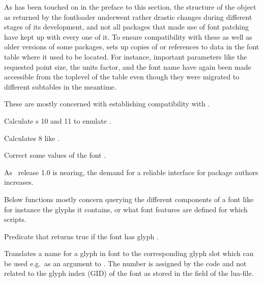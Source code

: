 As has been touched on in the preface to this section, the structure
of the object as returned by the fontloader underwent rather drastic
changes during different stages of its development, and not all
packages that made use of font patching have kept up with every one
of it.
%
To ensure compatibility with these as well as older versions of
some packages,  sets up copies of or references
to data in the font table where it used to be located.
%
For instance, important parameters like the requested point size, the
units factor, and the font name have again been made accessible from
the toplevel of the table even though they were migrated to different
subtables in the meantime.

\endsubsubsection


These are mostly concerned with establishing compatibility with \XeTeX.

\beginfunctionlist

    Calculate s 10 and 11 to emulate \XeTeX.
  \endaltitem

    Calculates  8 like \XeTeX.
  \endaltitem

    Correct some values of the font .
  \endaltitem

\endfunctionlist

\endsubsection


As \LuaTeX\ release 1.0 is nearing, the demand for a reliable interface
for package authors increases.

\endsubsubsection


Below functions mostly concern querying the different components of a
font like for instance the glyphs it contains, or what font features
are defined for which scripts.

\beginfunctionlist

            Predicate that returns true if the font 
            has glyph .
  \endaltitem

            Translates a name for a glyph in font  to the
            corresponding glyph slot which can be used e.g.\ as an argument to
            \inlinecode{\char}. The number is assigned by the  code
            and not related to the glyph index (GID) of the font as stored in the \identifier{[index]} field
            of the lua-file.
  \endaltitem


